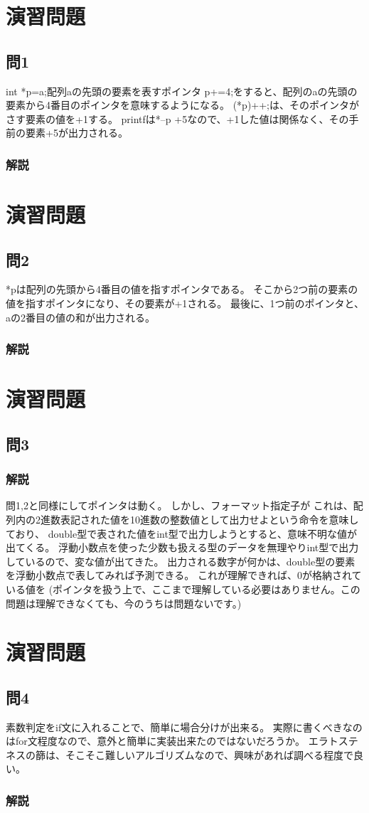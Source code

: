 \section{演習問題}
\subsection{問1}
int *p=a;配列aの先頭の要素を表すポインタ
p+=4;をすると、配列のaの先頭の要素から4番目のポインタを意味するようになる。
(*p)++;は、そのポインタがさす要素の値を+1する。
printfは*--p +5なので、+1した値は関係なく、その手前の要素+5が出力される。
\subsubsection{解説}

\section{演習問題}
\subsection{問2}
*pは配列の先頭から4番目の値を指すポインタである。
そこから2つ前の要素の値を指すポインタになり、その要素が+1される。
最後に、1つ前のポインタと、aの2番目の値の和が出力される。
\subsubsection{解説}

\section{演習問題}
\subsection{問3}
\subsubsection{解説}
問1,2と同様にしてポインタは動く。
しかし、フォーマット指定子が%
これは、配列内の2進数表記された値を10進数の整数値として出力せよという命令を意味しており、
double型で表された値をint型で出力しようとすると、意味不明な値が出てくる。
浮動小数点を使った少数も扱える型のデータを無理やりint型で出力しているので、変な値が出てきた。
出力される数字が何かは、double型の要素を浮動小数点で表してみれば予測できる。
これが理解できれば、0が格納されている値を%
(ポインタを扱う上で、ここまで理解している必要はありません。この問題は理解できなくても、今のうちは問題ないです。)

\section{演習問題}

\subsection{問4}
素数判定をif文に入れることで、簡単に場合分けが出来る。
実際に書くべきなのはfor文程度なので、意外と簡単に実装出来たのではないだろうか。
エラトステネスの篩は、そこそこ難しいアルゴリズムなので、興味があれば調べる程度で良い。
\subsubsection{解説}
